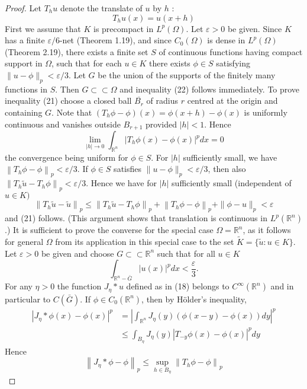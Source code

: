 \begin{proof}
  Let $T_h u$ denote the translate of $u$ by $h$ :
  \[
  T_h u(x)=u(x+h)
  \]
  First we assume that $K$ is precompact in $L^p(\Omega)$. Let $\varepsilon>0$ be given. Since $K$ has a finite $\varepsilon / 6$-net (Theorem 1.19), and since $C_0(\Omega)$ is dense in $L^p(\Omega)$ (Theorem 2.19), there exists a finite set $S$ of continuous functions having compact support in $\Omega$, such that for each $u \in K$ there exists $\phi \in S$ satisfying $\|u-\phi\|_p<\varepsilon / 3$. Let $G$ be the union of the supports of the finitely many functions in $S$. Then $G \subset\subset \Omega$ and inequality (22) follows immediately. To prove inequality (21) choose a closed ball $\overline{B_r}$ of radius $r$ centred at the origin and containing $G$. Note that $\left(T_h \phi-\phi\right)(x)=\phi(x+h)-\phi(x)$ is uniformly continuous and vanishes outside $B_{r+1}$ provided $|h|<1$. Hence
  \[
  \lim _{|h| \rightarrow 0} \int_{\mathbb{R}^n}\left|T_h \phi(x)-\phi(x)\right|^p d x=0
  \]
  the convergence being uniform for $\phi \in S$. For $|h|$ sufficiently small, we have $\left\|T_h \phi-\phi\right\|_p<\varepsilon / 3$. If $\phi \in S$ satisfies $\|u-\phi\|_p<\varepsilon / 3$, then also $\left\|T_h \tilde{u}-T_h \phi\right\|_p<\varepsilon / 3$. Hence we have for $|h|$ sufficiently small (independent of $u \in K)$
  \[
  \left\|T_h \tilde{u}-\tilde{u}\right\|_p \leq\left\|T_h \tilde{u}-T_h \phi\right\|_p+\left\|T_h \phi-\phi\right\|_p+\|\phi-u\|_p<\varepsilon
  \]
  and (21) follows. (This argument shows that translation is continuous in $L^p(\mathbb{R}^n)$.)
  It is sufficient to prove the converse for the special case $\Omega=\mathbb{R}^n$, as it follows for general $\Omega$ from its application in this special case to the set $\tilde{K}=\{\tilde{u}: u \in K\}$.
  Let $\varepsilon>0$ be given and choose $G \subset\subset \mathbb{R}^n$ such that for all $u \in K$
  \[
  \int_{\mathbb{R}^n-\bar{G}}|u(x)|^p d x<\frac{\varepsilon}{3} .
  \]
  For any $\eta>0$ the function $J_\eta * u$ defined as in (18) belongs to $C^{\infty}(\mathbb{R}^n)$ and in particular to $C(\bar{G})$. If $\phi \in C_0(\mathbb{R}^n)$, then by Hölder's inequality,
  \[
  \begin{aligned}
  \left|J_\eta * \phi(x)-\phi(x)\right|^p & =\left|\int_{\mathbb{R}^n} J_\eta(y)(\phi(x-y)-\phi(x)) d y\right|^p \\
  & \leq \int_{B_\eta} J_\eta(y)\left|T_{-y} \phi(x)-\phi(x)\right|^p d y
  \end{aligned}
  \]
  Hence
  \[
  \left\|J_\eta * \phi-\phi\right\|_p \leq \sup _{h \in B_\eta}\left\|T_h \phi-\phi\right\|_p
\]
\end{proof}

